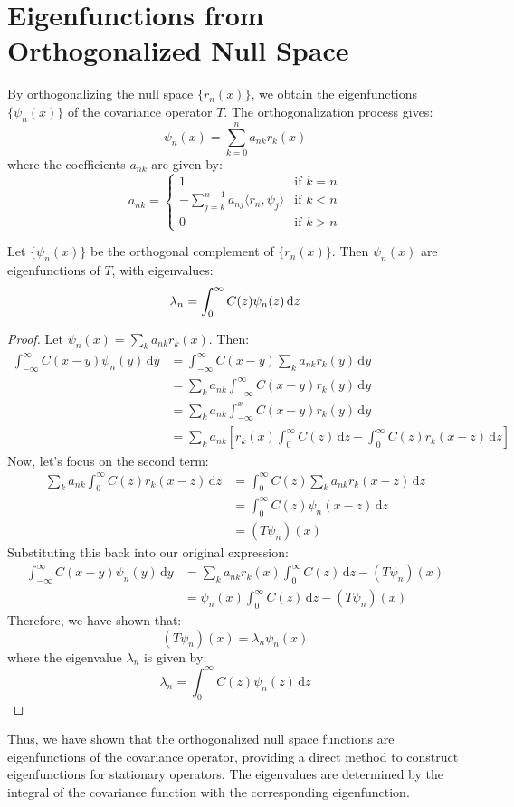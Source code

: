 \documentclass{article}
\newcommand{\mathd}{\mathrm{d}}
\begin{document}
\section{Eigenfunctions from Orthogonalized Null Space}
By orthogonalizing the null space $\{r_n(x)\}$, we obtain the eigenfunctions $\{\psi_n(x)\}$ of the covariance operator $T$. The orthogonalization process gives:
\[ \psi_n(x) = \sum_{k=0}^n a_{nk}r_k(x) \]
where the coefficients $a_{nk}$ are given by:
\[ a_{nk} = \left\{
\begin{array}{ll}
1 & \text{if } k = n\\
-\sum_{j=k}^{n-1} a_{nj}\langle r_n,\psi_j\rangle & \text{if } k < n\\
0 & \text{if } k > n
\end{array}
\right. \]

\begin{theorem}
  Let $\{\psi_n (x)\}$ be the orthogonal complement of $\{r_n (x)\}$. Then
  $\psi_n (x)$ are eigenfunctions of $T$, with eigenvalues:
  \[ \lambda_n = \int_0^{\infty} C (z) \psi_n (z)  \hspace{0.17em} \mathd z \]
\end{theorem}

\begin{proof}
Let $\psi_n(x) = \sum_k a_{nk}r_k(x)$. Then:
\begin{align*}
\int_{-\infty}^{\infty} C(x-y)\psi_n(y) \,\mathd y &= \int_{-\infty}^{\infty} C(x-y) \sum_k a_{nk}r_k(y) \,\mathd y\\
&= \sum_k a_{nk} \int_{-\infty}^{\infty} C(x-y)r_k(y) \,\mathd y\\
&= \sum_k a_{nk} \int_{-\infty}^x C(x-y)r_k(y) \,\mathd y\\
&= \sum_k a_{nk} \left[r_k(x)\int_0^{\infty} C(z)\,\mathd z - \int_0^{\infty} C(z)r_k(x-z) \,\mathd z\right]
\end{align*}
Now, let's focus on the second term:
\begin{align*}
\sum_k a_{nk} \int_0^{\infty} C(z)r_k(x-z) \,\mathd z &= \int_0^{\infty} C(z)\sum_k a_{nk}r_k(x-z) \,\mathd z\\
&= \int_0^{\infty} C(z)\psi_n(x-z) \,\mathd z\\
&= (T\psi_n)(x)
\end{align*}
Substituting this back into our original expression:
\begin{align*}
\int_{-\infty}^{\infty} C(x-y)\psi_n(y) \,\mathd y &= \sum_k a_{nk}r_k(x)\int_0^{\infty} C(z)\,\mathd z - (T\psi_n)(x)\\
&= \psi_n(x)\int_0^{\infty} C(z)\,\mathd z - (T\psi_n)(x)
\end{align*}
Therefore, we have shown that:
\[ (T\psi_n)(x) = \lambda_n\psi_n(x) \]
where the eigenvalue $\lambda_n$ is given by:
\[ \lambda_n = \int_0^{\infty} C(z)\psi_n(z) \,\mathd z \]
\end{proof}

Thus, we have shown that the orthogonalized null space functions are eigenfunctions of the covariance operator, providing a direct method to construct eigenfunctions for stationary operators. The eigenvalues are determined by the integral of the covariance function with the corresponding eigenfunction.
\end{document}
